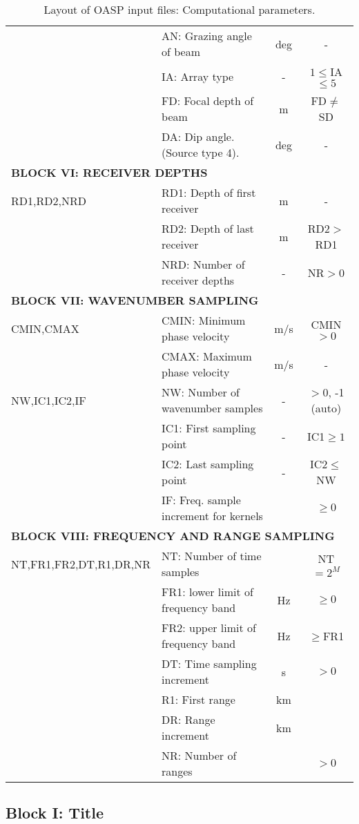 \begin{table}
\begin{center}
\begin{tabular}{|l|l|c|c|}
	& AN: Grazing angle of beam & deg & - \\
	& IA: Array type & - & $1 \leq $IA$\leq 5$ \\
	& FD: Focal depth of beam & m & FD$\neq$SD \\
        & DA: Dip angle. (Source type 4). & deg & - \\
\hline
\multicolumn{4}{|l|}{\bf BLOCK VI: RECEIVER DEPTHS} \\
\hline
RD1,RD2,NRD & RD1: Depth of first receiver & m & - \\
	& RD2: Depth of last receiver  & m & RD2$>$RD1 \\
	& NRD: Number of receiver depths & - & NR$>0$ \\
\hline
\multicolumn{4}{|l|}{\bf BLOCK VII: WAVENUMBER SAMPLING} \\
\hline
CMIN,CMAX & CMIN: Minimum phase velocity & m/s & CMIN$>0$ \\
	& CMAX: Maximum phase velocity & m/s & - \\
NW,IC1,IC2,IF & NW: Number of wavenumber samples & - & $>0$, -1 (auto) \\
	& IC1: First sampling point & - & IC1$\geq 1$ \\
	& IC2: Last sampling point & - & IC2$\leq$NW \\
        & IF: Freq. sample increment for kernels & & $\geq 0$ \\
\hline
\multicolumn{4}{|l|}{\bf BLOCK VIII: FREQUENCY AND RANGE  SAMPLING} \\
\hline
NT,FR1,FR2,DT,R1,DR,NR & NT: Number of time samples & & NT$=2^{M}$ \\
	& FR1: lower limit of frequency band & Hz & $\geq 0$ \\
	& FR2: upper limit of frequency band & Hz & $\geq$FR1 \\
        & DT: Time sampling increment & s & $> 0$ \\ 
        & R1: First range & km & \\
        & DR: Range increment & km & \\
	& NR: Number of ranges & & $> 0$ \\
\hline
\end{tabular}
\end{center}
\caption{Layout of OASP input files: Computational parameters.
	\label{tab:oaspI} }
\end{table} 

\subsection{Block I: Title}

